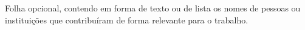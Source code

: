 
\acknowledgements
Folha opcional, contendo em forma de texto ou de lista os nomes de pessoas ou instituições que contribuíram de forma relevante para o trabalho.